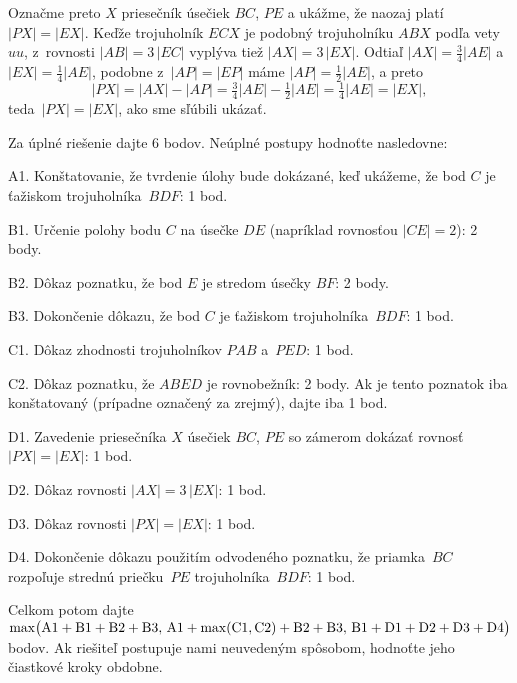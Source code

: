 {Označme preto $X$ priesečník úsečiek $BC$, $PE$ a ukážme,
že naozaj platí $|PX|=|EX|$. Keďže trojuholník $ECX$ je podobný
trojuholníku $ABX$ podľa vety $uu$,
z~rovnosti $|AB|=3\,|EC|$ vyplýva tiež $|AX|=3\,|EX|$.
Odtiaľ $|AX|=\frac34|AE|$ a $|EX|=\frac14|AE|$, podobne
z~$|AP|=|EP|$ máme $|AP|=\frac12|AE|$, a preto
$$
|PX|=|AX|-|AP|=\tfrac34|AE|-\tfrac12|AE|=\tfrac14|AE|=|EX|,
$$
teda~$|PX|=|EX|$, ako sme sľúbili ukázať.

\schemaABC
Za úplné riešenie dajte 6 bodov. Neúplné postupy hodnoťte nasledovne:

\smallskip
\item{A1.} Konštatovanie, že tvrdenie úlohy bude dokázané, keď ukážeme, že bod $C$ je ťažiskom trojuholníka~$BDF$: 1 bod.
\item{B1.} Určenie polohy bodu $C$ na úsečke $DE$ (napríklad rovnosťou $|CE|=2$): 2 body.
\item{B2.} Dôkaz poznatku, že bod $E$ je stredom úsečky $BF$: 2 body.
\item{B3.} Dokončenie dôkazu, že bod $C$ je ťažiskom trojuholníka~$BDF$: 1 bod.
\item{C1.} Dôkaz zhodnosti trojuholníkov $PAB$ a~$PED$: 1 bod.
\item{C2.} Dôkaz poznatku, že $ABED$ je rovnobežník: 2 body. Ak je tento poznatok iba konštatovaný (prípadne označený za zrejmý), dajte iba 1 bod.
\item{D1.} Zavedenie priesečníka $X$ úsečiek $BC$, $PE$ so zámerom dokázať rovnosť $|PX|=|EX|$: 1 bod.
\item{D2.} Dôkaz rovnosti $|AX|=3\,|EX|$: 1 bod.
\item{D3.} Dôkaz rovnosti $|PX|=|EX|$: 1 bod.
\item{D4.} Dokončenie dôkazu použitím odvodeného poznatku, že priamka~$BC$ rozpoľuje strednú priečku~$PE$ trojuholníka~$BDF$: 1 bod.

\smallskip\noindent
Celkom potom dajte
$\rm\max\bigl(A1+B1+B2+B3,\,A1+\max(C1,C2)+B2+B3,\,
B1+D1+D2+D3+D4\bigr)$ bodov.
Ak riešiteľ postupuje nami neuvedeným
spôsobom, hodnoťte jeho čiastkové kroky obdobne.
\endschema
}

